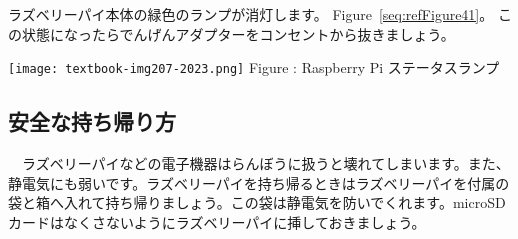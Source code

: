 \documentclass[a4paper,12pt]{jarticle}
\begin{document}
\bigskip
\flushleft
\textcolor[rgb]{0.13333334,0.13333334,0.13333334}{ラズベリーパイ本体の緑色のランプが消灯します。
  Figure~\ref{seq:refFigure41}。
  この状態になったらでんげんアダプターをコンセントから抜きましょう。}

\bigskip
\centering
\begin{minipage}{8.207cm}
  {\upshape
    \texttt{[image: textbook-img207-2023.png]}
    \newline
    Figure {\theFigure\label{seq:refFigure41}}: Raspberry Pi
    ステータスランプ}
\end{minipage}
\clearpage\subsection{安全な持ち帰り方}
\flushleft
\ \ ラズベリーパイなどの電子機器はらんぼうに扱うと壊れてしまいます。また、静電気にも弱いです。ラズベリーパイを持ち帰るときはラズベリーパイを付属の袋と箱へ入れて持ち帰りましょう。この袋は静電気を防いでくれます。microSDカードはなくさないようにラズベリーパイに挿しておきましょう。

\clearpage
\end{document}
